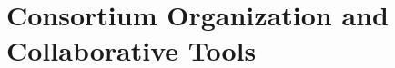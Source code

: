 \documentclass[../main-v1.tex]{subfiles}
\begin{document}
\chapter{Consortium Organization and Collaborative Tools}
\label{ch:org}


\end{document}
